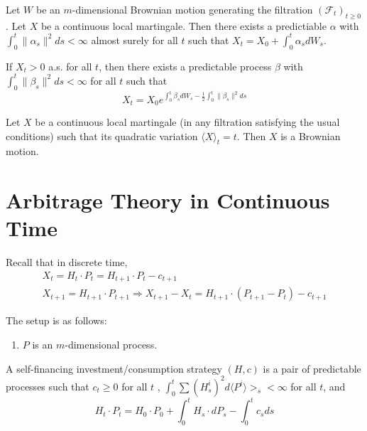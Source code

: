 \begin{thm}
  \label{defn:continuous_time:16}
  Let $W$ be an $m$-dimensional Brownian motion generating the
  filtration $(\mathcal{F}_{t})_{t \geq 0}$.
  Let $X$ be a continuous local martingale.  Then there exists a
  predictiable $\alpha$ with $\int_{0}^{t} \| \alpha_{s} \|^{2} ds <
  \infty$ almost surely for all $t$ such that $X_{t} = X_{0} +
  \int_{0}^{t} \alpha_{s} dW_{s}$.

  If $X_{t} > 0$ a.s. for all $t$, then there exists a predictable
  process $\beta$ with $\int_{0}^{t} \| \beta_{s} \|^{2} ds < \infty$
  for all $t$ such that
  \begin{equation}
    \label{eq:54}
    X_{t} = X_{0} e^{\int_{0}^{t} \beta_{s} dW_{s} - \frac{1}{2}
      \int_{0}^{t} \| \beta_{s} \|^{2} ds}
  \end{equation}
\end{thm}

\begin{thm}
  \label{defn:continuous_time:17}
  Let $X$ be a continuous local martingale (in any filtration
  satisfying the usual conditions) such that its quadratic variation
  $\langle X \rangle_{t} = t$.  Then $X$ is a Brownian motion.
\end{thm}


\section{Arbitrage Theory in Continuous Time}
\label{sec:arbitr-theory-cont}

Recall that in discrete time,
\begin{align}
  \label{eq:55}
  X_{t} = H_{t} \cdot P_{t} = H_{t+1} \cdot P_{t} - c_{t+1} \\
  X_{t+1} = H_{t+1} \cdot P_{t+1} \Rightarrow X_{t+1} - X_{t} =
  H_{t+1} \cdot (P_{t+1} - P_{t}) - c_{t+1}
\end{align}

The setup is as follows:
\begin{enumerate}
\item $P$ is an $m$-dimensional \ito process.
\end{enumerate}

\begin{defn}
  \label{defn:continuous_time:18}
  A self-financing investment/consumption strategy $(H, c)$ is a pair
  of predictable processes such that $c_{t} \geq 0$ for all $t$ ,
  $\int_{0}^{t} \sum (H_{s}^{i})^{2} d \langle P^{i} \rangle>_{s} <
  \infty$ for all $t$, and
  \begin{equation}
    \label{eq:56}
    H_{t} \cdot P_{t} = H_{0} \cdot P_{0} + \int_{0}^{t} H_{s} \cdot
    dP_{s} - \int_{0}^{t} c_{s} ds
  \end{equation}
\end{defn}

